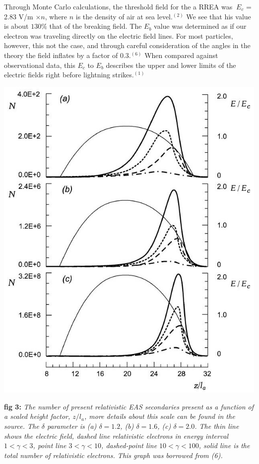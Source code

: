 \documentclass[11pt]{article}
\begin{document}
\begin{multicols*}{2}
    Through Monte Carlo calculations, the threshold field for the a RREA was $~E_c$ = 2.83 V/m $\times n$, where $n$ is the density of air at sea level.$^{(2)}$ We see that his value is about $130\%$ that of the breaking field. The $E_b$ value was determined as if our electron was traveling directly on the electric field lines. For most particles, however, this not the case, and through careful consideration of the angles in the theory the field inflates by a factor of $0.3$.$^{(6)}$ When compared against observational data, this $E_c$ to $E_b$ describes the upper and lower limits of the electric fields right before lightning strikes.$^{(1)}$
    
    \begin{center}
        \includegraphics[width=0.95 \linewidth]{images/Dependence on relativistic electrons plot.JPG}
    \end{center}
    \textbf{fig 3:} \textit{The number of present relativistic EAS secondaries present as a function of a scaled height factor, $z/l_a$, more details about this scale can be found in the source. The $\delta$ parameter is (a) $\delta = 1.2$, (b) $\delta = 1.6$, (c) $\delta = 2.0$. The thin line shows the electric field, dashed line relativistic electrons in energy interval $1< \gamma <3$, point line $3< \gamma < 10$, dashed-point line $10< \gamma <100$, solid line is the total number of relativistic electrons. This graph was borrowed from (6).}
    

\end{multicols*}
\end{document}
